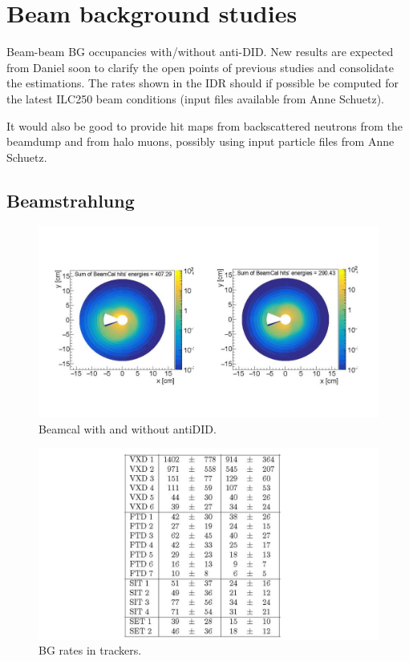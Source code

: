 \vspace{2cm}

\section{Beam background studies}

Beam-beam BG occupancies with/without anti-DID. New results are expected from Daniel soon to clarify the open points of previous studies and consolidate the estimations. The rates shown in the IDR should if possible be computed for the latest ILC250 beam conditions (input files available from Anne Schuetz).

It would also be good to provide hit maps from backscattered neutrons from the beamdump and from halo muons, possibly using input particle files from Anne Schuetz.
\subsection{Beamstrahlung}

\begin{figure}[t!]
\includegraphics[width=0.8\hsize]{Integration/fig/BG_beamcal.jpg}
\caption{\label{fig:integration:beamcal}Beamcal with and without antiDID.}
\end{figure}

\begin{figure}[t!]
\includegraphics[width=0.8\hsize]{Integration/fig/BG_rates.jpg}
\caption{\label{fig:integration:rates}BG rates in trackers.}
\end{figure}

